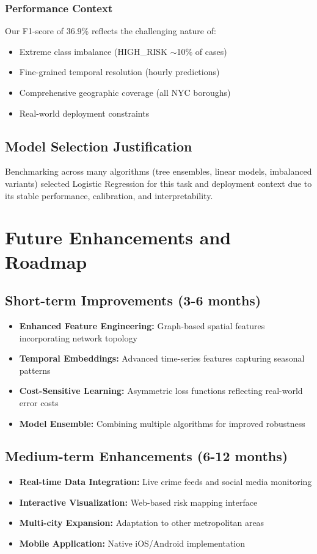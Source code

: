 \documentclass[11pt]{article}
\begin{document}
\subsubsection{Performance Context}
Our F1-score of 36.9\% reflects the challenging nature of:
\begin{itemize}[leftmargin=*]
\item Extreme class imbalance (HIGH\_RISK $\sim$10\% of cases)
\item Fine-grained temporal resolution (hourly predictions)
\item Comprehensive geographic coverage (all NYC boroughs)
\item Real-world deployment constraints
\end{itemize}

\subsection{Model Selection Justification}
Benchmarking across many algorithms (tree ensembles, linear models, imbalanced variants) selected Logistic Regression for this task and deployment context due to its stable performance, calibration, and interpretability.

\section{Future Enhancements and Roadmap}

\subsection{Short-term Improvements (3-6 months)}
\begin{itemize}[leftmargin=*]
\item \textbf{Enhanced Feature Engineering:} Graph-based spatial features incorporating network topology
\item \textbf{Temporal Embeddings:} Advanced time-series features capturing seasonal patterns
\item \textbf{Cost-Sensitive Learning:} Asymmetric loss functions reflecting real-world error costs
\item \textbf{Model Ensemble:} Combining multiple algorithms for improved robustness
\end{itemize}

\subsection{Medium-term Enhancements (6-12 months)}
\begin{itemize}[leftmargin=*]
\item \textbf{Real-time Data Integration:} Live crime feeds and social media monitoring
\item \textbf{Interactive Visualization:} Web-based risk mapping interface
\item \textbf{Multi-city Expansion:} Adaptation to other metropolitan areas
\item \textbf{Mobile Application:} Native iOS/Android implementation
\end{itemize}
\end{document}
